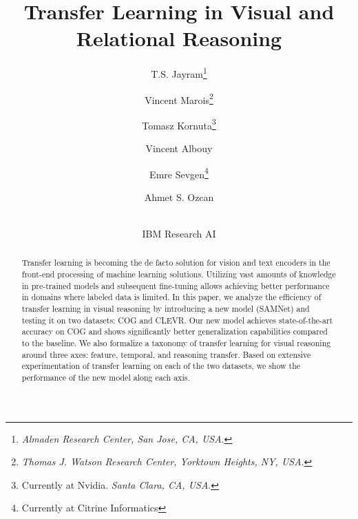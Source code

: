 \documentclass[11pt]{article}
\begin{document}
\title{Transfer Learning in Visual and Relational Reasoning}

\author{%
T.S. Jayram\thanks{\textit{Almaden Research Center, San Jose, CA, USA}.} \hspace{1cm} \and  
Vincent Marois\thanks{\textit{Thomas J. Watson Research Center, Yorktown Heights, NY, USA}.} \hspace{1cm} \and 
Tomasz Kornuta\thanks{Currently at Nvidia. \textit{Santa Clara, CA, USA}.} \and
\hspace{2cm} Vincent Albouy\footnotemark[1]  \hspace{1cm} \and 
Emre Sevgen\thanks{Currently at Citrine Informatics}  \hspace{1cm} \and 
Ahmet S. Ozcan\footnotemark[1] \and \\
IBM Research AI
}

\date{}

\maketitle

\begin{abstract}
  Transfer learning is becoming the de facto solution for vision and text encoders in the front-end processing of machine learning solutions. Utilizing vast amounts of knowledge in pre-trained models and subsequent fine-tuning allows achieving better performance in domains where labeled data is limited. In this paper, we analyze the efficiency of transfer learning in visual reasoning by introducing a new model (SAMNet) and testing it on two datasets: COG and CLEVR.  Our new model achieves state-of-the-art accuracy on COG and shows significantly better generalization capabilities compared to the baseline. We also formalize a taxonomy of transfer learning for visual reasoning around three axes: feature, temporal, and reasoning transfer. Based on extensive experimentation of transfer learning on each of the two datasets, we show the performance of the new model along each axis.
\end{abstract}
















\newpage
\appendix


\end{document}
